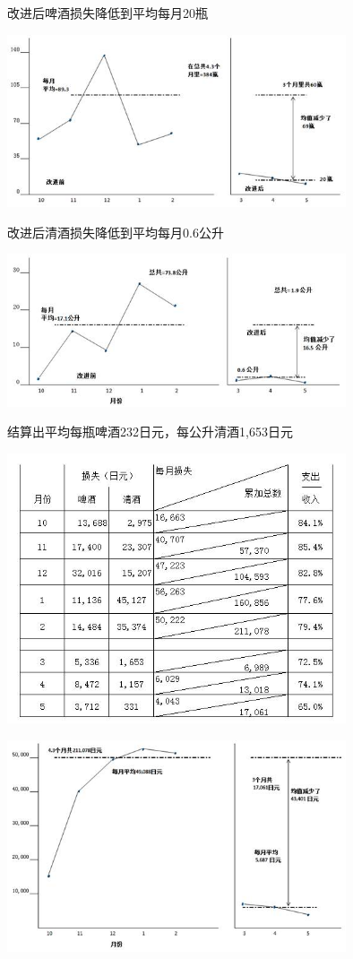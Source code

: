 改进后啤酒损失降低到平均每月20瓶 


\includegraphics[width=10cm]{club201.jpg}

改进后清酒损失降低到平均每月0.6公升 

\includegraphics[width=10cm]{club202.jpg}

结算出平均每瓶啤酒232日元，每公升清酒1,653日元 


\includegraphics[width=10cm]{club211.jpg}


\includegraphics[width=10cm]{club221.jpg}

